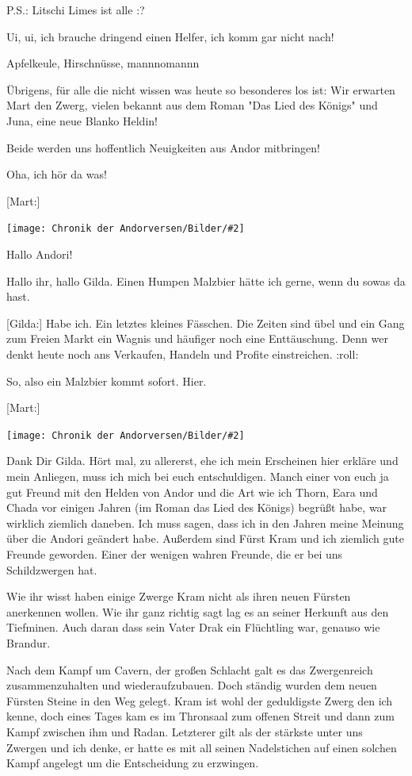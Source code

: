 \documentclass[10pt, a4paper, oneside]{book}
\newcommand{\bildmitts}[2][height=0.32\textwidth,width=0.48\textwidth,keepaspectratio]{%
    \begin{center}
        \texttt{[image: Chronik der Andorversen/Bilder/\#2]}
    \end{center}
}
\begin{document}
\begin{multicols}{2}
P.S.: Litschi Limes ist alle :?

Ui, ui, ich brauche dringend einen Helfer, ich komm gar nicht nach!

Apfelkeule, Hirschnüsse, mannnomannn

Übrigens, für alle die nicht wissen was heute so besonderes los ist: Wir erwarten Mart den Zwerg, vielen bekannt aus dem Roman "Das Lied des Königs" und Juna, eine neue Blanko Heldin!

Beide werden uns hoffentlich Neuigkeiten aus Andor mitbringen!

Oha, ich hör da was!

[Mart:] 

\bildmitts{AA2016 Treffen mit Mart und Juna 1.jpeg}

Hallo Andori!

Hallo ihr, hallo Gilda. Einen Humpen Malzbier hätte ich gerne, wenn du sowas da hast.

[Gilda:] Habe ich. Ein letztes kleines Fässchen. Die Zeiten sind übel und ein Gang zum Freien Markt ein Wagnis und häufiger noch eine Enttäuschung. Denn wer denkt heute noch ans Verkaufen, Handeln und Profite einstreichen. :roll:

So, also ein Malzbier kommt sofort. Hier.

[Mart:]

\bildmitts{AA2016 Treffen mit Mart und Juna 2.jpeg}

Dank Dir Gilda. Hört mal, zu allererst, ehe ich mein Erscheinen hier erkläre und mein Anliegen, muss ich mich bei euch entschuldigen. Manch einer von euch ja gut Freund mit den Helden von Andor und die Art wie ich Thorn, Eara und Chada vor einigen Jahren (im Roman das Lied des Königs) begrüßt habe, war wirklich ziemlich daneben. Ich muss sagen, dass ich in den Jahren meine Meinung über die Andori geändert habe. Außerdem sind Fürst Kram und ich ziemlich gute Freunde geworden. Einer der wenigen wahren Freunde, die er bei uns Schildzwergen hat.

Wie ihr wisst haben einige Zwerge Kram nicht als ihren neuen Fürsten anerkennen wollen. Wie ihr ganz richtig sagt lag es an seiner Herkunft aus den Tiefminen. Auch daran dass sein Vater Drak ein Flüchtling war, genauso wie Brandur.

Nach dem Kampf um Cavern, der großen Schlacht galt es das Zwergenreich zusammenzuhalten und wiederaufzubauen. Doch ständig wurden dem neuen Fürsten Steine in den Weg gelegt. Kram ist wohl der geduldigste Zwerg den ich kenne, doch eines Tages kam es im Thronsaal zum offenen Streit und dann zum Kampf zwischen ihm und Radan. Letzterer gilt als der stärkste unter uns Zwergen und ich denke, er hatte es mit all seinen Nadelstichen auf einen solchen Kampf angelegt um die Entscheidung zu erzwingen.


\end{multicols}
\end{document}
